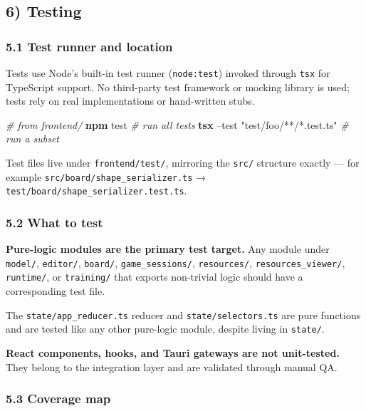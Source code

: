 \documentclass[]{article}
\newenvironment{Shaded}{\begin{snugshade}}{\end{snugshade}}
\newcommand{\KeywordTok}[1]{\textcolor[rgb]{0.13,0.29,0.53}{\textbf{{#1}}}}
\newcommand{\StringTok}[1]{\textcolor[rgb]{0.31,0.60,0.02}{{#1}}}
\newcommand{\CommentTok}[1]{\textcolor[rgb]{0.56,0.35,0.01}{\textit{{#1}}}}
\newcommand{\NormalTok}[1]{{#1}}
\begin{document}
\subsection{6) Testing}\label{testing}

\subsubsection{5.1 Test runner and
location}\label{test-runner-and-location}

Tests use Node's built-in test runner (\texttt{node:test}) invoked
through \texttt{tsx} for TypeScript support. No third-party test
framework or mocking library is used; tests rely on real implementations
or hand-written stubs.

\begin{Shaded}
\begin{Highlighting}[]
\CommentTok{# from frontend/}
\KeywordTok{npm} \NormalTok{test                                       }\CommentTok{# run all tests}
\KeywordTok{tsx} \NormalTok{--test }\StringTok{"test/foo/**/*.test.ts"}             \CommentTok{# run a subset}
\end{Highlighting}
\end{Shaded}

Test files live under \texttt{frontend/test/}, mirroring the
\texttt{src/} structure exactly --- for example
\texttt{src/board/shape\_serializer.ts} →
\texttt{test/board/shape\_serializer.test.ts}.

\subsubsection{5.2 What to test}\label{what-to-test}

\textbf{Pure-logic modules are the primary test target.} Any module
under \texttt{model/}, \texttt{editor/}, \texttt{board/},
\texttt{game\_sessions/}, \texttt{resources/},
\texttt{resources\_viewer/}, \texttt{runtime/}, or \texttt{training/}
that exports non-trivial logic should have a corresponding test file.

The \texttt{state/app\_reducer.ts} reducer and
\texttt{state/selectors.ts} are pure functions and are tested like any
other pure-logic module, despite living in \texttt{state/}.

\textbf{React components, hooks, and Tauri gateways are not
unit-tested.} They belong to the integration layer and are validated
through manual QA.

\subsubsection{5.3 Coverage map}\label{coverage-map}
\end{document}
